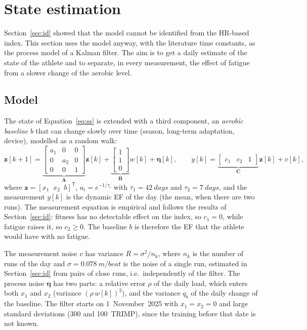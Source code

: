 \documentclass[11pt,a4paper]{article}
\begin{document}
\section{State estimation}\label{sec:kf}

Section~\ref{sec:id} showed that the model cannot be identified from the HR-based
index. This section uses the model anyway, with the literature time constants, as
the process model of a Kalman filter. The aim is to get a daily estimate of the
state of the athlete and to separate, in every measurement, the effect of fatigue
from a slower change of the aerobic level.

\subsection{Model}
The state of Equation~\eqref{eq:ss} is extended with a third component, an
\emph{aerobic baseline} $b$ that can change slowly over time (season, long-term
adaptation, device), modelled as a random walk:
\begin{equation}
\mathbf{z}[k+1] = \underbrace{\begin{bmatrix} a_1 & 0 & 0\\ 0 & a_2 & 0\\ 0 & 0 & 1\end{bmatrix}}_{\mathbf{A}}\mathbf{z}[k]
 + \underbrace{\begin{bmatrix}1\\1\\0\end{bmatrix}}_{\mathbf{B}} w[k] + \boldsymbol{\eta}[k],
\qquad
y[k] = \underbrace{\begin{bmatrix} c_1 & c_2 & 1\end{bmatrix}}_{\mathbf{C}}\mathbf{z}[k] + v[k],
\label{eq:kfmodel}
\end{equation}
where $\mathbf{z} = [x_1\;\;x_2\;\;b]^{\mathsf T}$, $a_i = e^{-1/\tau_i}$ with
$\tau_1 = \SI{42}{days}$ and $\tau_2 = \SI{7}{days}$, and the measurement $y[k]$
is the dynamic EF of the day (the mean, when there are two runs). The
measurement equation is empirical and follows the results of
Section~\ref{sec:id}: fitness has no detectable effect on the index, so $c_1 = 0$,
while fatigue raises it, so $c_2 \geq 0$. The baseline $b$ is therefore the EF
that the athlete would have with no fatigue.

The measurement noise $v$ has variance $R = \sigma^2/n_k$, where $n_k$ is the
number of runs of the day and $\sigma = \SI{0.078}{m/beat}$ is the noise of a
single run, estimated in Section~\ref{sec:id} from pairs of close runs, i.e.\
independently of the filter. The process noise $\boldsymbol{\eta}$ has two parts: a
relative error $\rho$ of the daily load, which enters both $x_1$ and $x_2$
(variance $(\rho\, w[k])^2$), and the variance $q_b$ of the daily change of the
baseline. The filter starts on 1~November~2025 with $x_1 = x_2 = 0$ and large
standard deviations (300 and 100~TRIMP), since the training before that date
is not known.
\end{document}
